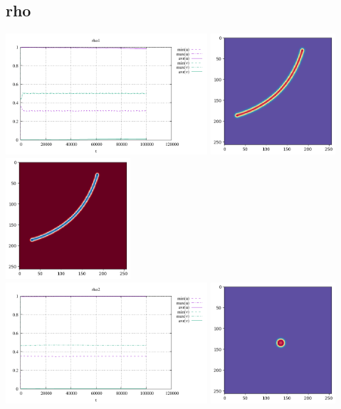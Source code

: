 \subsection*{rho}
\begin{center}
\includegraphics[height=4.5cm]{python_codes/fieldstone_171/results/rho1_stats}
\includegraphics[height=4.5cm]{python_codes/fieldstone_171/results/rho1_solution_final_u.png}
\includegraphics[height=4.5cm]{python_codes/fieldstone_171/results/rho1_solution_final_v.png}\\
\includegraphics[height=4.5cm]{python_codes/fieldstone_171/results/rho2_stats}
\includegraphics[height=4.5cm]{python_codes/fieldstone_171/results/rho2_solution_final_u.png}

\end{center}

